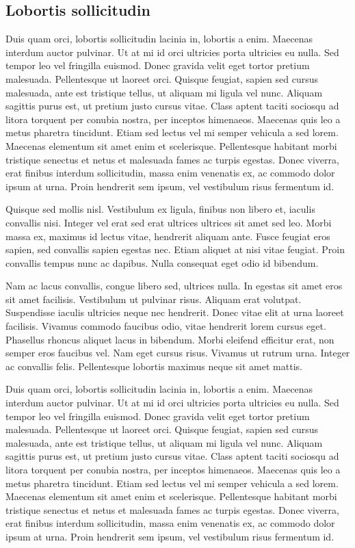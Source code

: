 \documentclass[a4paper,10pt]{book}
\begin{document}
\subsection{Lobortis sollicitudin}

Duis quam orci, lobortis sollicitudin lacinia in, lobortis a enim. Maecenas interdum auctor pulvinar.
Ut at mi id orci ultricies porta ultricies eu nulla. Sed tempor leo vel fringilla euismod. Donec gravida velit
eget tortor pretium malesuada. Pellentesque ut laoreet orci. Quisque feugiat, sapien sed cursus malesuada,
ante est tristique tellus, ut aliquam mi ligula vel nunc. Aliquam sagittis purus est, ut pretium justo cursus vitae.
Class aptent taciti sociosqu ad litora torquent per conubia nostra, per inceptos himenaeos.
Maecenas quis leo a metus pharetra tincidunt. Etiam sed lectus vel mi semper vehicula a sed lorem.
Maecenas elementum sit amet enim et scelerisque.
Pellentesque habitant morbi tristique senectus et netus et malesuada fames ac turpis egestas.
Donec viverra, erat finibus interdum sollicitudin, massa enim venenatis ex, ac commodo dolor ipsum at urna.
Proin hendrerit sem ipsum, vel vestibulum risus fermentum id.

Quisque sed mollis nisl. Vestibulum ex ligula, finibus non libero et, iaculis convallis nisi.
Integer vel erat sed erat ultrices ultrices sit amet sed leo. Morbi massa ex, maximus id lectus vitae,
hendrerit aliquam ante. Fusce feugiat eros sapien, sed convallis sapien egestas nec. Etiam aliquet at
nisi vitae feugiat. Proin convallis tempus nunc ac dapibus. Nulla consequat eget odio id bibendum.

Nam ac lacus convallis, congue libero sed, ultrices nulla. In egestas sit amet eros sit amet facilisis.
Vestibulum ut pulvinar risus. Aliquam erat volutpat. Suspendisse iaculis ultricies neque nec hendrerit.
Donec vitae elit at urna laoreet facilisis. Vivamus commodo faucibus odio, vitae hendrerit lorem cursus eget.
Phasellus rhoncus aliquet lacus in bibendum. Morbi eleifend efficitur erat, non semper eros faucibus vel.
Nam eget cursus risus. Vivamus ut rutrum urna. Integer ac convallis felis.
Pellentesque lobortis maximus neque sit amet mattis.

Duis quam orci, lobortis sollicitudin lacinia in, lobortis a enim. Maecenas interdum auctor pulvinar.
Ut at mi id orci ultricies porta ultricies eu nulla. Sed tempor leo vel fringilla euismod. Donec gravida velit
eget tortor pretium malesuada. Pellentesque ut laoreet orci. Quisque feugiat, sapien sed cursus malesuada,
ante est tristique tellus, ut aliquam mi ligula vel nunc. Aliquam sagittis purus est, ut pretium justo cursus vitae.
Class aptent taciti sociosqu ad litora torquent per conubia nostra, per inceptos himenaeos.
Maecenas quis leo a metus pharetra tincidunt. Etiam sed lectus vel mi semper vehicula a sed lorem.
Maecenas elementum sit amet enim et scelerisque.
Pellentesque habitant morbi tristique senectus et netus et malesuada fames ac turpis egestas.
Donec viverra, erat finibus interdum sollicitudin, massa enim venenatis ex, ac commodo dolor ipsum at urna.
Proin hendrerit sem ipsum, vel vestibulum risus fermentum id.
\end{document}
